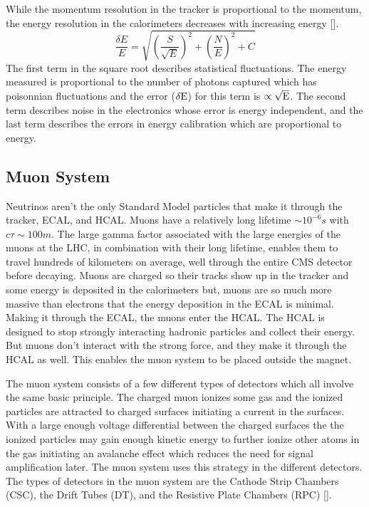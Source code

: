 While the momentum resolution in the tracker is proportional to the momentum, the energy resolution in the calorimeters decreases with increasing energy [\cite{pdgreview}].
\begin{equation}
\frac{\delta E}{E} = \sqrt{\left(\frac{S}{\sqrt{E}}\right)^2 + \left(\frac{N}{E}\right)^2 + C}
\end{equation}
The first term in the square root describes statistical fluctuations. The energy measured is proportional to the number of photons captured which has poisonnian fluctuations and the error (${\rm \delta E}$) for this term is $\propto \sqrt{{\rm E}}$. The second term describes noise in the electronics whose error is energy independent, and the last term describes the errors in energy calibration which are proportional to energy.

\FloatBarrier
\subsection{Muon System}
Neutrinos aren't the only Standard Model particles that make it through the tracker, ECAL, and HCAL. Muons have a relatively long lifetime $\sim 10^{-6} s$  with $c\tau \sim 100 m$. The large gamma factor associated with the large energies of the muons at the LHC, in combination with their long lifetime, enables them to travel hundreds of kilometers on average, well through the entire CMS detector before decaying. Muons are charged so their tracks show up in the tracker and some energy is deposited in the calorimeters but, muons are so much more massive than electrons that the energy deposition in the ECAL is minimal. Making it through the ECAL, the muons enter the HCAL. The HCAL is designed to stop strongly interacting hadronic particles and collect their energy. But muons don't interact with the strong force, and they make it through the HCAL as well. This enables the muon system to be placed outside the magnet.

The muon system consists of a few different types of detectors which all involve the same basic principle. The charged muon ionizes some gas and the ionized particles are attracted to charged surfaces initiating a current in the surfaces. With a large enough voltage differential between the charged surfaces the the ionized particles may gain enough kinetic energy to further ionize other atoms in the gas initiating an avalanche effect which reduces the need for signal amplification later. The muon system uses this strategy in the different detectors. The types of detectors in the muon system are the Cathode Strip Chambers (CSC), the Drift Tubes (DT), and the Resistive Plate Chambers (RPC) [\cite{tdr}].

